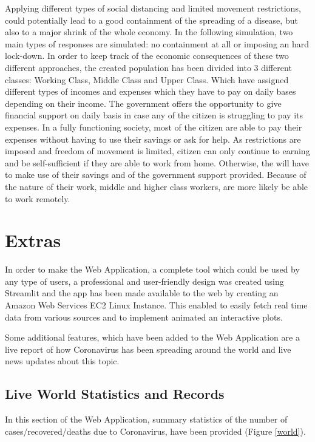 Applying different types of social distancing and limited movement restrictions, could potentially lead to a good containment of the spreading of a disease, but also to a major shrink of the whole economy. In the following simulation, two main types of responses are simulated: no containment at all or imposing an hard lock-down. In order to keep track of the economic consequences of these two different approaches, the created population has been divided into 3 different classes: Working Class, Middle Class and Upper Class. Which have assigned different types of incomes and expenses which they have to pay on daily bases depending on their income. The government offers the opportunity to give financial support on daily basis in case any of the citizen is struggling to pay its expenses. In a fully functioning society, most of the citizen are able to pay their expenses without having to use their savings or ask for help. As restrictions are imposed and freedom of movement is limited, citizen can only continue to earning and be self-sufficient if they are able to work from home. Otherwise, the will have to make use of their savings and of the government support provided. Because of the nature of their work, middle and higher class workers, are more likely be able to work remotely.

\section{Extras}
In order to make the Web Application, a complete tool which could be used by any type of users, a professional and user-friendly design was created using Streamlit and the app has been made available to the web by creating an Amazon Web Services EC2 Linux Instance. This enabled to easily fetch real time data from various sources and to implement animated an interactive plots.

Some additional features, which have been added to the Web Application are a live report of how Coronavirus has been spreading around the world and live news updates about this topic.

\subsection{Live World Statistics and Records}

In this section of the Web Application, summary statistics of the number of cases/recovered/deaths due to Coronavirus, have been provided (Figure \ref{world}). 

